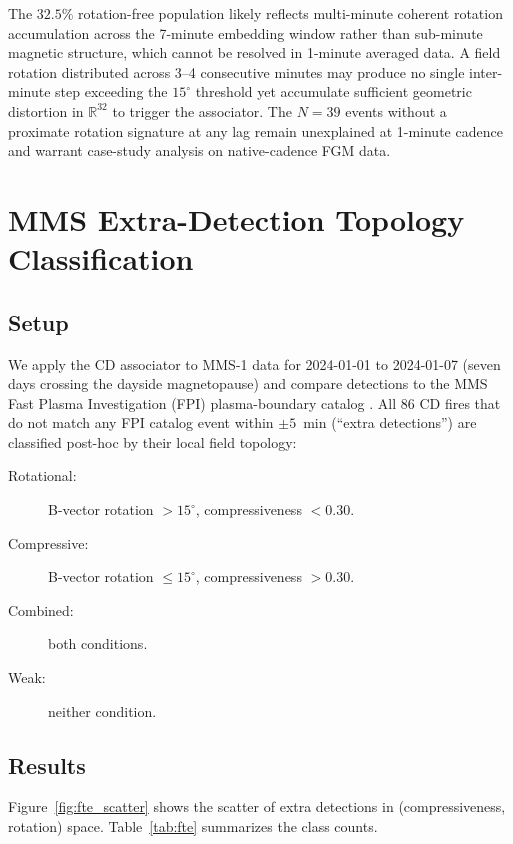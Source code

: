 \documentclass[draft]{agujournal2025}
\let\citep\cite%
\begin{document}
The $32.5\%$ rotation-free population likely reflects multi-minute coherent
rotation accumulation across the 7-minute embedding window rather than
sub-minute magnetic structure, which cannot be resolved in 1-minute averaged
data.  A field rotation distributed across 3--4 consecutive minutes may
produce no single inter-minute step exceeding the $15^\circ$ threshold
yet accumulate sufficient geometric distortion in $\mathbb{R}^{32}$ to trigger
the associator.  The $N = 39$ events without a proximate rotation signature at
any lag remain unexplained at 1-minute cadence and warrant case-study analysis
on native-cadence FGM data.

\section{MMS Extra-Detection Topology Classification}
\label{sec:mms_fte}

\subsection{Setup}

We apply the CD associator to MMS-1 \citep{burch2016} data for
2024-01-01 to 2024-01-07 (seven days crossing the dayside magnetopause)
and compare detections to the MMS Fast Plasma Investigation (FPI)
plasma-boundary catalog \citep{pollock2016}.
All 86 CD fires that do not match any FPI catalog event within $\pm 5$~min
(``extra detections'') are classified post-hoc by their local field topology:
\begin{description}
  \item[Rotational:] B-vector rotation $> 15^\circ$, compressiveness $< 0.30$.
  \item[Compressive:] B-vector rotation $\leq 15^\circ$, compressiveness $> 0.30$.
  \item[Combined:] both conditions.
  \item[Weak:] neither condition.
\end{description}

\subsection{Results}

Figure~\ref{fig:fte_scatter} shows the scatter of extra detections in
(compressiveness, rotation) space.  Table~\ref{tab:fte} summarizes the
class counts.
\end{document}
